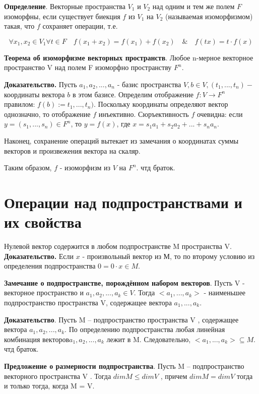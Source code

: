 \documentclass[a4paper]{article}
\begin{document}
\textbf{Определение}. Векторные пространства $V_1$ и $V_2$ над одним и тем же полем $F$ изоморфны, если существует биекция $f$ из $V_1$ на $V_2$ (называемая изоморфизмом) такая, что $f$ сохраняет операции, т.е. 

\begin{equation}
\forall x_1, x_2 \in V_1 \forall t \in F \quad f(x_1+x_2) = f(x_1) + f(x_2) \quad \& \quad f(tx) = t \cdot f(x)
\end{equation}

\textbf{Теорема об изоморфизме векторных пространств}. Любое n-мерное векторное пространство V над полем F изоморфно
пространству $F^n$.

\textbf{Доказательство.} Пусть $a_1, a_2, ..., a_n$ - базис пространства $V, b \in V, (t_1, ..., t_n) - $ координаты вектора $b$ в этом базисе. Определим отображение $f: V \rightarrow F^n$ правилом: $f(b) := t_1, ..., t_n)$. Поскольку координаты определяют вектор однозначно, то отображение $f$ инъективно. Сюръективность $f$ очевидна: если $y = (s_1, ..., s_n) \in F^n$, то $y = f(x)$, где $x = s_1a_1 + s_2a_2 + ... + s_na_n$.

Наконец, сохранение операций вытекает из замечания о координатах суммы векторов и произвежения вектора на скаляр. 

Таким образом, $f$ - изоморфизм из $V$ на $F^n$. чтд браток.

\section*{Операции над подпространствами и их свойства}

Нулевой вектор содержится в любом подпространстве M пространства V.
\textbf{Доказательство.} Если $x$ - произвольный вектор из М, то по второму условию из определения подпространства $0 = 0 \cdot x \in M$.

\textbf{Замечание о подпространстве, порождённом набором векторов}. Пусть V - векторное пространство и $a_1, a_2, ..., a_k \in V$. Тогда $<a_1, ..., a_k>$ - наименьшее подпространство пространства V, содержащее вектора $a_1, ..., a_k$.

\textbf{Доказательство}. Пусть M – подпространство пространства V , содержащее
вектора $a_1, a_2, ..., a_k$. По определению подпространства любая линейная
комбинация векторов$a_1, a_2, ..., a_k$ лежит в M. Следовательно,
$<a_1, ..., a_k> \subseteq M$. чтд браток.

\textbf{Предложение о размерности подпространства}. 
Пусть M – подпространство векторного пространства V . Тогда
$dim M \leq dim V$ , причем $dim M = dim V$ тогда и только тогда, когда
M = V.
\end{document}
